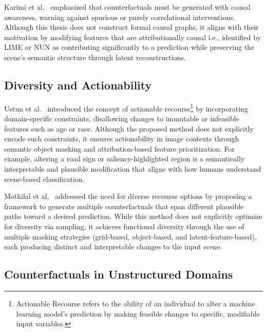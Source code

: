 Karimi et al.~\cite{karimi2020algorithmic} emphasized that counterfactuals must be generated with causal awareness, warning against spurious or purely correlational interventions. Although this thesis does not construct formal causal graphs, it aligns with their motivation by modifying features that are attributionally causal i.e., identified by LIME or NUN as contributing significantly to a prediction while preserving the scene’s semantic structure through latent reconstructions.

\subsection{Diversity and Actionability}

Ustun et al.~\cite{ustun2019actionable} introduced the concept of actionable recourse\footnote{Actionable Recourse refers to the ability of an individual to alter a machine learning model's prediction by making feasible changes to specific, modifiable input variables.} by incorporating domain-specific constraints, disallowing changes to immutable or infeasible features such as age or race. Although the proposed method does not explicitly encode such constraints, it ensures actionability in image contexts through semantic object masking and attribution-based feature prioritization. For example, altering a road sign or saliency-highlighted region is a semantically interpretable and plausible modification that aligns with how humans understand scene-based classification.

Mothilal et al.~\cite{DBLP:journals/corr/abs-1905-07697} addressed the need for diverse recourse options by proposing a framework to generate multiple counterfactuals that span different plausible paths toward a desired prediction. While this method does not explicitly optimize for diversity via sampling, it achieves functional diversity through the use of multiple masking strategies (grid-based, object-based, and latent-feature-based), each producing distinct and interpretable changes to the input scene.

\subsection{Counterfactuals in Unstructured Domains}

